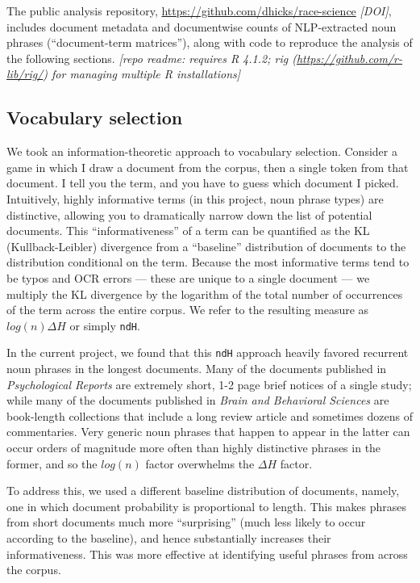 \documentclass[12pt]{article}
\begin{document}
The public analysis repository, \url{https://github.com/dhicks/race-science} \emph{{[}DOI{]}}, includes document metadata and documentwise counts of NLP-extracted noun phrases (``document-term matrices''), along with code to reproduce the analysis of the following sections. \emph{{[}repo readme: requires R 4.1.2; rig (\url{https://github.com/r-lib/rig/}) for managing multiple R installations{]}}

\hypertarget{vocabulary-selection}{%
\subsection{Vocabulary selection}\label{vocabulary-selection}}

We took an information-theoretic approach to vocabulary selection\cite{HicksProductivityInterdisciplinaryImpacts2021}. Consider a game in which I draw a document from the corpus, then a single token from that document. I tell you the term, and you have to guess which document I picked. Intuitively, highly informative terms (in this project, noun phrase types) are distinctive, allowing you to dramatically narrow down the list of potential documents. This ``informativeness'' of a term can be quantified as the KL (Kullback-Leibler) divergence from a ``baseline'' distribution of documents to the distribution conditional on the term. Because the most informative terms tend to be typos and OCR errors --- these are unique to a single document --- we multiply the KL divergence by the logarithm of the total number of occurrences of the term across the entire corpus. We refer to the resulting measure as \(log(n) \Delta H\) or simply \texttt{ndH}.

In the current project, we found that this \texttt{ndH} approach heavily favored recurrent noun phrases in the longest documents. Many of the documents published in \emph{Psychological Reports} are extremely short, 1-2 page brief notices of a single study; while many of the documents published in \emph{Brain and Behavioral Sciences} are book-length collections that include a long review article and sometimes dozens of commentaries. Very generic noun phrases that happen to appear in the latter can occur orders of magnitude more often than highly distinctive phrases in the former, and so the \(log(n)\) factor overwhelms the \(\Delta H\) factor.

To address this, we used a different baseline distribution of documents, namely, one in which document probability is proportional to length. This makes phrases from short documents much more ``surprising'' (much less likely to occur according to the baseline), and hence substantially increases their informativeness. This was more effective at identifying useful phrases from across the corpus.
\end{document}
